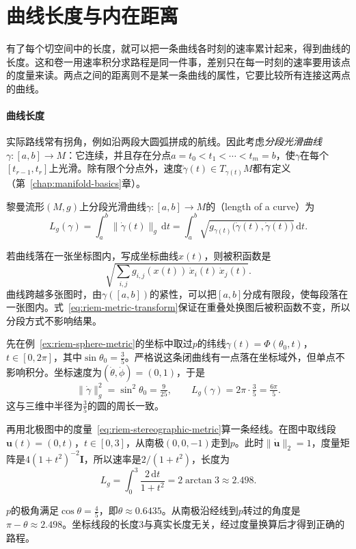 \section{曲线长度与内在距离}
\label{sec:riem-length-distance}

有了每个切空间中的长度，就可以把一条曲线各时刻的速率累计起来，得到曲线的长度。这和卷一用速率积分求路程是同一件事，差别只在每一时刻的速率要用该点的度量来读。两点之间的距离则不是某一条曲线的属性，它要比较所有连接这两点的曲线。

\paragraph{曲线长度}
实际路线常有拐角，例如沿两段大圆弧拼成的航线。因此考虑\emph{分段光滑曲线}$\gamma:[a,b]\to M$：它连续，并且存在分点$a=t_0<t_1<\cdots<t_m=b$，使$\gamma$在每个$[t_{r-1},t_r]$上光滑。除有限个分点外，速度$\dot\gamma(t)\in T_{\gamma(t)}M$都有定义（第~\ref{chap:manifold-basics}章）。

\begin{definition}[曲线长度]
\label{def:riem-curve-length}
黎曼流形$(M,g)$上分段光滑曲线$\gamma:[a,b]\to M$的（length of a curve）为
\begin{equation}
L_g(\gamma)=\int_a^b\lVert\dot\gamma(t)\rVert_g\,\mathrm dt
=\int_a^b\sqrt{g_{\gamma(t)}\bigl(\dot\gamma(t),\dot\gamma(t)\bigr)}\,\mathrm dt .
\label{eq:riem-curve-length}
\end{equation}
\end{definition}

若曲线落在一张坐标图内，写成坐标曲线$x(t)$，则被积函数是
\[
\sqrt{\sum_{i,j}g_{i,j}(x(t))\,\dot x_i(t)\,\dot x_j(t)}.
\]
曲线跨越多张图时，由$\gamma([a,b])$的紧性，可以把$[a,b]$分成有限段，使每段落在一张图内。式~\eqref{eq:riem-metric-transform}保证在重叠处换图后被积函数不变，所以分段方式不影响结果。

\begin{example}[球面上两条曲线的长度]
\label{ex:riem-latitude-length}
先在例~\ref{ex:riem-sphere-metric}的坐标中取过$p$的纬线$\gamma(t)=\Phi(\theta_0,t)$，$t\in[0,2\pi]$，其中$\sin\theta_0=\tfrac35$。严格说这条闭曲线有一点落在坐标域外，但单点不影响积分。坐标速度为$(\dot\theta,\dot\phi)=(0,1)$，于是
\[
\lVert\dot\gamma\rVert_g^2=\sin^2\theta_0=\tfrac9{25},\qquad L_g(\gamma)=2\pi\cdot\tfrac35=\tfrac{6\pi}5 .
\]
这与三维中半径为$\tfrac35$的圆的周长一致。

再用北极图中的度量~\eqref{eq:riem-stereographic-metric}算一条经线。在图中取线段$\bm u(t)=(0,t)$，$t\in[0,3]$，从南极$(0,0,-1)$走到$p$。此时$\lVert\dot{\bm u}\rVert_2=1$，度量矩阵是$4(1+t^2)^{-2}\bm I$，所以速率是$2/(1+t^2)$，长度为
\[
L_g=\int_0^3\frac{2\,\mathrm dt}{1+t^2}=2\arctan3\approx2.498 .
\]

$p$的极角满足$\cos\theta=\tfrac45$，即$\theta\approx0.6435$。从南极沿经线到$p$转过的角度是$\pi-\theta\approx2.498$。坐标线段的长度$3$与真实长度无关，经过度量换算后才得到正确的路程。
\end{example}

